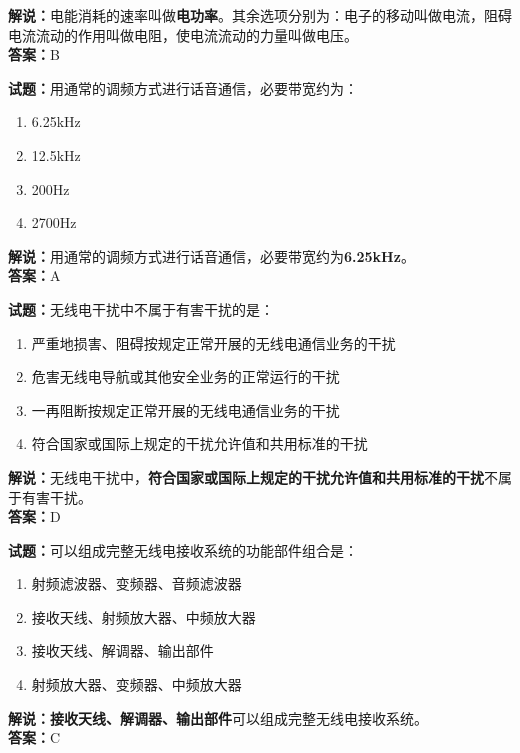 \documentclass{ctexbook}
\begin{document}
\noindent\textbf{解说：}电能消耗的速率叫做\textbf{电功率}。其余选项分别为：电子的移动叫做电流，阻碍电流流动的作用叫做电阻，使电流流动的力量叫做电压。\\\noindent\textbf{答案：}B


\bigskip


\noindent\textbf{试题：}用通常的调频方式进行话音通信，必要带宽约为：

\begin{enumerate}[leftmargin=3em]
	\item 6.25kHz
	\item 12.5kHz
	\item 200Hz
	\item 2700Hz
\end{enumerate}

\noindent\textbf{解说：}用通常的调频方式进行话音通信，必要带宽约为\textbf{6.25kHz}。\\\noindent\textbf{答案：}A%


\bigskip


\noindent\textbf{试题：}无线电干扰中不属于有害干扰的是：

\begin{enumerate}[leftmargin=3em]
	\item 严重地损害、阻碍按规定正常开展的无线电通信业务的干扰
	\item 危害无线电导航或其他安全业务的正常运行的干扰
	\item 一再阻断按规定正常开展的无线电通信业务的干扰
	\item 符合国家或国际上规定的干扰允许值和共用标准的干扰
\end{enumerate}

\noindent\textbf{解说：}无线电干扰中，\textbf{符合国家或国际上规定的干扰允许值和共用标准的干扰}不属于有害干扰。\\\noindent\textbf{答案：}D%


\bigskip


\noindent\textbf{试题：}可以组成完整无线电接收系统的功能部件组合是：

\begin{enumerate}[leftmargin=3em]
	\item 射频滤波器、变频器、音频滤波器
	\item 接收天线、射频放大器、中频放大器
	\item 接收天线、解调器、输出部件
	\item 射频放大器、变频器、中频放大器
\end{enumerate}

\noindent\textbf{解说：}\textbf{接收天线、解调器、输出部件}可以组成完整无线电接收系统。\\\noindent\textbf{答案：}C%
\end{document}
